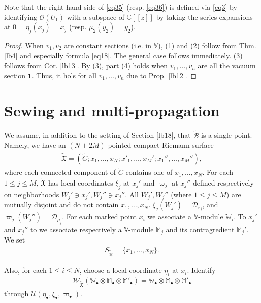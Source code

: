 \documentclass[12pt,a4paper,notitlepage]{article}
\theoremstyle{definition}
\theoremstyle{plain}
\newcommand{\fk}{\mathfrak}
\newcommand{\mc}{\mathcal}
\newcommand{\wtd}{\widetilde}
\newcommand{\id}{\mathbf{1}}
\newcommand{\scr}{\mathscr}
\newcommand{\blt}{\bullet}
\newcommand{\Vbb}{\mathbb V}
\newcommand{\Wbb}{\mathbb W}
\newcommand{\Mbb}{\mathbb M}
\newcommand{\Cbb}{\mathbb C}
\numberwithin{equation}{section}
\begin{document}
Note that the right hand side of \eqref{eq35} (resp. \eqref{eq36})  is defined via \eqref{eq3} by identifying $\scr O(U_1)$ with a subspace of $\Cbb[[z]]$ by taking the series expansions at $0=\eta_j(x_j)=x_j$ (resp. $\mu_2(y_2)=y_2$).

\begin{proof}
When $v_1,v_2$ are constant sections (i.e. in $\Vbb$), (1) and (2) follow from Thm. \ref{lb4} and especially formula \eqref{eq18}. The general case follows immediately. (3) follows from Cor. \ref{lb13}. By  (3), part (4) holds when $v_1,\dots,v_n$ are all the vacuum section $\id$. Thus, it hols for all $v_1,\dots,v_n$ due to Prop. \ref{lb12}.
\end{proof}





\section{Sewing and multi-propagation}

We assume, in addition to the setting of Section \ref{lb18}, that $\wtd{\mc B}$ is a single point. Namely, we have an $(N+2M)$-pointed compact Riemann surface
\begin{align*}
\wtd{\fk X}=(\wtd C;x_1,\dots,x_N;x'_1,\dots,x_M';x_1'',\dots,x_M''),	
\end{align*}
where each connected component of $\wtd C$ contains one of $x_1,\dots,x_N$. For each $1\leq j\leq M$, $\wtd {\fk X}$ has  local coordinates $\xi_j$ at $x_j'$ and $\varpi_j$ at $x_j''$ defined respectively on neighborhoods $W_j'\ni x_j',W_j''\ni x_j''$. All $W_j',W_j''$ (where $1\leq j\leq M$) are mutually disjoint and do not contain $x_1,\dots,x_N$. $\xi_j(W_j')=\mc D_{r_j}$, and $\varpi_j(W_j'')=\mc D_{\rho_j}$. For each marked point $x_i$ we associate a $\Vbb$-module $\Wbb_i$. To $x_j'$ and $x_j''$ to we associate respectively a $\Vbb$-module $\Mbb_j$ and its contragredient $\Mbb_j'$. We set
\begin{align*}
S_{\wtd{\fk X}}=\{x_1,\dots,x_N\}.	
\end{align*}


Also, for each $1\leq i\leq N$, choose a local coordinate $\eta_i$ at $x_i$. Identify
\begin{align*}
\scr W_{\wtd{\fk X}}(\Wbb_\blt\otimes\Mbb_\blt\otimes\Mbb'_\blt)=\Wbb_\blt\otimes\Mbb_\blt\otimes\Mbb'_\blt	
\end{align*}
through $\mc U(\eta_\blt,\xi_\blt,\varpi_\blt)$.
\end{document}
